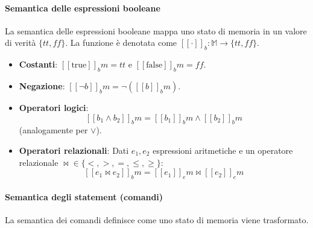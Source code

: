 \paragraph{Semantica delle espressioni booleane}
La semantica delle espressioni booleane mappa uno stato di memoria in un valore di verità $\{tt, ff\}$. La funzione è denotata come $[\![ \cdot ]\!]_b : \mathbb{M} \to \{tt, ff\}$.

\begin{itemize}
    \item \textbf{Costanti}: $[\![ \text{true} ]\!]_b m = tt$ e $[\![ \text{false} ]\!]_b m = ff$.
    \item \textbf{Negazione}: $[\![ \neg b ]\!]_b m = \neg ([\![ b ]\!]_b m)$.
    \item \textbf{Operatori logici}:
    \[ [\![ b_1 \land b_2 ]\!]_b m = [\![ b_1 ]\!]_b m \land [\![ b_2 ]\!]_b m \]
    (analogamente per $\lor$).
    \item \textbf{Operatori relazionali}: Dati $e_1, e_2$ espressioni aritmetiche e un operatore relazionale $\bowtie \in \{<, >, =, \le, \ge\}$:
    \[ [\![ e_1 \bowtie e_2 ]\!]_b m = [\![ e_1 ]\!]_e m \bowtie [\![ e_2 ]\!]_e m \]
\end{itemize}

\paragraph{Semantica degli statement (comandi)}
La semantica dei comandi definisce come uno stato di memoria viene trasformato.

